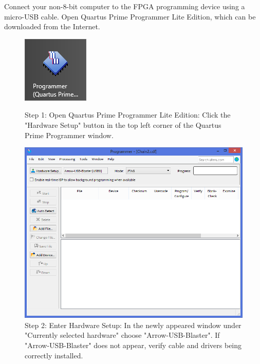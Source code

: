 Connect your non-8-bit computer to the FPGA programming device using a micro-USB cable.
Open Quartus Prime Programmer Lite Edition, which can be downloaded from the Internet.

\begin{figure}[H]
  \centering
  \includegraphics{images/max10_01.png}
  \captionsetup{width=0.8\linewidth}
  \caption{Step 1: Open Quartus Prime Programmer Lite Edition:
           Click the "Hardware Setup" button in the top left corner of
           the Quartus Prime Programmer window.}
  \label{fig:max10_01}

\vspace{5mm}

  \includegraphics[width=0.8\linewidth]{images/max10_02.png}
  \captionsetup{width=0.8\linewidth}
  \caption{Step 2: Enter Hardware Setup:
           In the newly appeared window under "Currently selected
           hardware" choose "Arrow-USB-Blaster".
           If "Arrow-USB-Blaster" does not appear, verify cable and
           drivers being correctly installed.}
  \label{fig:max10_02}
\end{figure}


